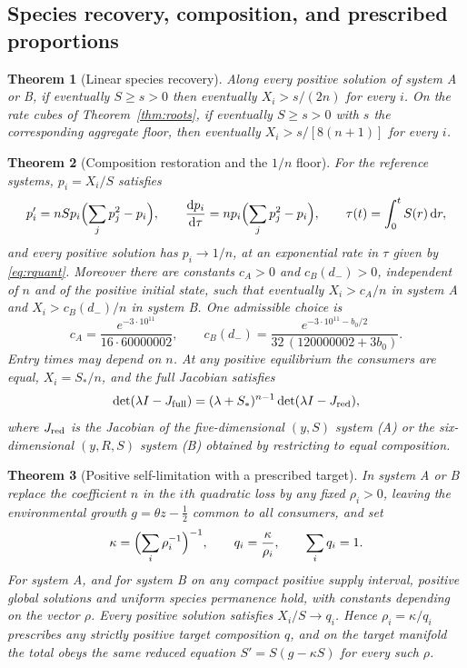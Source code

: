 \documentclass[11pt,a4paper]{article}
\theoremstyle{plain}
\newtheorem{theorem}{Theorem}[section]
\theoremstyle{definition}
\theoremstyle{remark}
\newcommand{\dd}{\mathrm d}
\begin{document}
\subsection{Species recovery, composition, and prescribed proportions}
\begin{theorem}[Linear species recovery]\label{thm:sharp}
Along every positive solution of system A or B, if eventually $S\ge s>0$ then eventually $X_i>s/(2n)$ for every $i$. On the rate cubes of Theorem~\ref{thm:roots}, if eventually $S\ge s>0$ with $s$ the corresponding aggregate floor, then eventually $X_i>s/[8(n+1)]$ for every $i$.
\end{theorem}

\begin{theorem}[Composition restoration and the $1/n$ floor]\label{thm:composition}
For the reference systems, $p_i=X_i/S$ satisfies
\begin{equation}\label{eq:p}
p_i'=nSp_i\Bigl(\sum_jp_j^2-p_i\Bigr),\qquad
\frac{\dd p_i}{\dd\tau}=np_i\Bigl(\sum_jp_j^2-p_i\Bigr),\qquad
\tau(t)=\int_0^tS(r)\,\dd r,
\end{equation}
and every positive solution has $p_i\to1/n$, at an exponential rate in $\tau$ given by \eqref{eq:rquant}. Moreover there are constants $c_A>0$ and $c_B(d_-)>0$, independent of $n$ and of the positive initial state, such that eventually $X_i>c_A/n$ in system A and $X_i>c_B(d_-)/n$ in system B. One admissible choice is
\begin{equation}\label{eq:nscale}
c_A=\frac{e^{-3\cdot10^{11}}}{16\cdot60000002},\qquad
c_B(d_-)=\frac{e^{-3\cdot10^{11}-b_0/2}}{32\,(120000002+3b_0)}.
\end{equation}
Entry times may depend on $n$. At any positive equilibrium the consumers are equal, $X_i=S_*/n$, and the full Jacobian satisfies
\begin{equation}\label{eq:spectrum}
\det(\lambda I-J_{\rm full})=(\lambda+S_*)^{n-1}\det(\lambda I-J_{\rm red}),
\end{equation}
where $J_{\rm red}$ is the Jacobian of the five-dimensional $(y,S)$ system (A) or the six-dimensional $(y,R,S)$ system (B) obtained by restricting to equal composition.
\end{theorem}

\begin{theorem}[Positive self-limitation with a prescribed target]\label{thm:unequal}
In system A or B replace the coefficient $n$ in the $i$th quadratic loss by any fixed $\rho_i>0$, leaving the environmental growth $g=\theta z-\tfrac12$ common to all consumers, and set
\[
\kappa=\Bigl(\sum_i\rho_i^{-1}\Bigr)^{-1},\qquad q_i=\frac{\kappa}{\rho_i},\qquad\sum_iq_i=1.
\]
For system A, and for system B on any compact positive supply interval, positive global solutions and uniform species permanence hold, with constants depending on the vector $\rho$. Every positive solution satisfies $X_i/S\to q_i$. Hence $\rho_i=\kappa/q_i$ prescribes any strictly positive target composition $q$, and on the target manifold the total obeys the same reduced equation $S'=S(g-\kappa S)$ for every such $\rho$.
\end{theorem}
\end{document}
